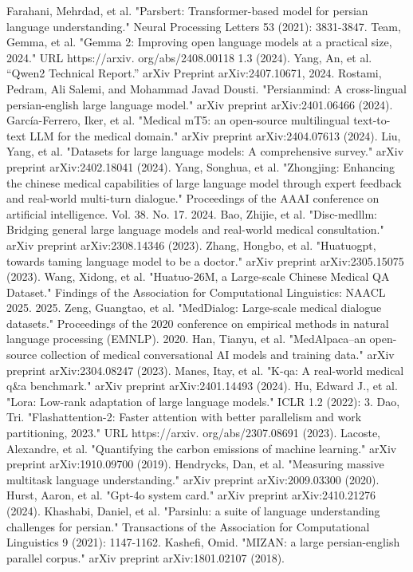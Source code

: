 \documentclass[conference]{IEEEtran}
\begin{document}
\begin{thebibliography}{00}
Farahani, Mehrdad, et al. "Parsbert: Transformer-based model for persian language understanding." Neural Processing Letters 53 (2021): 3831-3847.
Team, Gemma, et al. "Gemma 2: Improving open language models at a practical size, 2024." URL https://arxiv. org/abs/2408.00118 1.3 (2024).
Yang, An, et al. “Qwen2 Technical Report.” arXiv Preprint arXiv:2407.10671, 2024.
Rostami, Pedram, Ali Salemi, and Mohammad Javad Dousti. "Persianmind: A cross-lingual persian-english large language model." arXiv preprint arXiv:2401.06466 (2024).
García-Ferrero, Iker, et al. "Medical mT5: an open-source multilingual text-to-text LLM for the medical domain." arXiv preprint arXiv:2404.07613 (2024).
Liu, Yang, et al. "Datasets for large language models: A comprehensive survey." arXiv preprint arXiv:2402.18041 (2024).
Yang, Songhua, et al. "Zhongjing: Enhancing the chinese medical capabilities of large language model through expert feedback and real-world multi-turn dialogue." Proceedings of the AAAI conference on artificial intelligence. Vol. 38. No. 17. 2024.
Bao, Zhijie, et al. "Disc-medllm: Bridging general large language models and real-world medical consultation." arXiv preprint arXiv:2308.14346 (2023).
Zhang, Hongbo, et al. "Huatuogpt, towards taming language model to be a doctor." arXiv preprint arXiv:2305.15075 (2023).
Wang, Xidong, et al. "Huatuo-26M, a Large-scale Chinese Medical QA Dataset." Findings of the Association for Computational Linguistics: NAACL 2025. 2025.
Zeng, Guangtao, et al. "MedDialog: Large-scale medical dialogue datasets." Proceedings of the 2020 conference on empirical methods in natural language processing (EMNLP). 2020.
Han, Tianyu, et al. "MedAlpaca--an open-source collection of medical conversational AI models and training data." arXiv preprint arXiv:2304.08247 (2023).
Manes, Itay, et al. "K-qa: A real-world medical q\&a benchmark." arXiv preprint arXiv:2401.14493 (2024).
Hu, Edward J., et al. "Lora: Low-rank adaptation of large language models." ICLR 1.2 (2022): 3.
Dao, Tri. "Flashattention-2: Faster attention with better parallelism and work partitioning, 2023." URL https://arxiv. org/abs/2307.08691 (2023).
Lacoste, Alexandre, et al. "Quantifying the carbon emissions of machine learning." arXiv preprint arXiv:1910.09700 (2019).
Hendrycks, Dan, et al. "Measuring massive multitask language understanding." arXiv preprint arXiv:2009.03300 (2020).
Hurst, Aaron, et al. "Gpt-4o system card." arXiv preprint arXiv:2410.21276 (2024).
Khashabi, Daniel, et al. "Parsinlu: a suite of language understanding challenges for persian." Transactions of the Association for Computational Linguistics 9 (2021): 1147-1162.
Kashefi, Omid. "MIZAN: a large persian-english parallel corpus." arXiv preprint arXiv:1801.02107 (2018).
\end{thebibliography}
\end{document}
